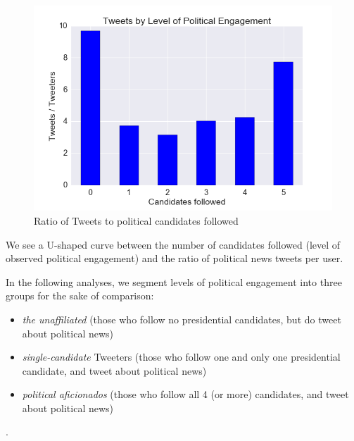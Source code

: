 \begin{figure}[H]  
\centering 
  \includegraphics[width=1.0\textwidth]{tweets-by-candid-ct}  
  \caption{Ratio of Tweets to political candidates followed
    \label{fig:candid-ct}}
\end{figure}

We see a U-shaped curve between the number of candidates followed (level of observed political engagement) and the ratio of political news tweets per user.


In the following analyses, we segment levels of political engagement into three groups for the sake of comparison:

\begin{itemize}
  \item \emph{the unaffiliated} (those who follow no presidential candidates, but do tweet about political news)
  \item \emph{single-candidate} Tweeters (those who follow one and only one presidential candidate, and tweet about political news)
  \item \emph{political aficionados} (those who follow all 4 (or more) candidates, and tweet about political news)
\end{itemize}.
















